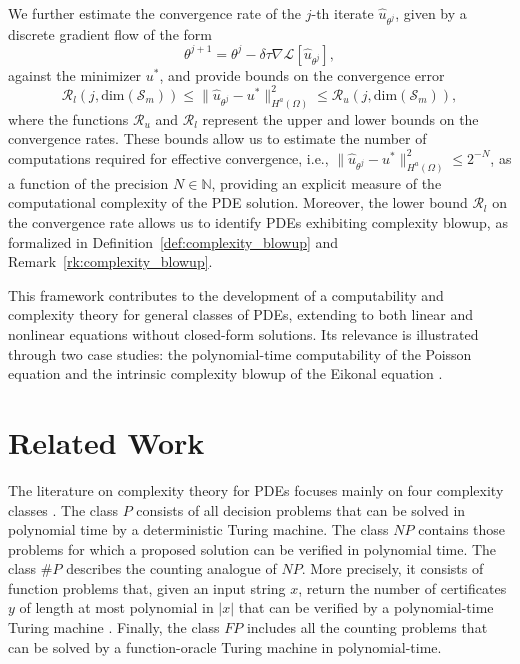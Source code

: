 \documentclass[pdflatex]{sn-jnl}%
\begin{document}
We further estimate the convergence rate of the $j$-th iterate $\hat{u}_{\theta^j}$, given by a discrete gradient flow of the form
\begin{equation}
    \theta^{j+1} = \theta^j-\delta\tau \nabla \mathcal{L}[\hat{u}_{\theta^j}],
\end{equation}
against the minimizer $u^*$, and provide bounds on the convergence error
\begin{equation}
\mathcal{R}_{l}(j, \mathrm{dim}(\mathcal{S}_m)) \leq  \|\hat{u}_{\theta^j} - u^*\|_{H^a(\Omega)}^2 \leq\mathcal{R}_u(j, \mathrm{dim}(\mathcal{S}_m)),
\end{equation}
where the functions $\mathcal{R}_u$ and $\mathcal{R}_l$ represent the upper and lower bounds on the convergence rates. 
These bounds allow us to estimate the number of computations required for effective convergence, i.e., $\|\hat{u}_{\theta^j} - u^*\|_{H^a(\Omega)}^2 \leq 2^{-N}$, as a function of the precision $N\in \mathbb{N}$, providing an explicit measure of the computational complexity of the PDE solution. Moreover, the lower bound $\mathcal{R}_l$ on the convergence rate allows us to identify PDEs exhibiting complexity blowup, as formalized in Definition~\ref{def:complexity_blowup} and Remark~\ref{rk:complexity_blowup}.

This framework contributes to the development of a computability and complexity theory for general classes of PDEs, extending to both linear and nonlinear equations without closed-form solutions. Its relevance is illustrated through two case studies: the polynomial-time computability of the Poisson equation \cite{Evans2022-ig} and the intrinsic complexity blowup of the Eikonal equation \cite{Alimov2019-np}.

\section{Related Work}
The literature on complexity theory for PDEs focuses mainly on four complexity classes \cite{bacho2023complexityblowupsolutionslaplace}. The class $P$ consists of all decision problems that can be solved in polynomial time by a deterministic Turing machine. The class $NP$ contains those problems for which a proposed solution can be verified in polynomial time. The class $\#P$ describes the counting analogue of $NP$. More precisely, it consists of function problems that, given an input string $x$, return the number of certificates $y$ of length at most polynomial in $|x|$ that can be verified by a polynomial-time Turing machine \cite{Arora2012-bh}. Finally, the class $FP$ includes all the counting problems that can be solved by a function-oracle Turing machine in polynomial-time.
\end{document}
